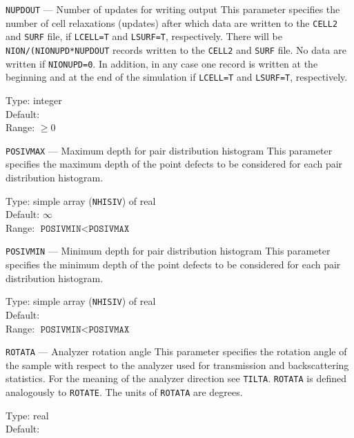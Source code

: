 \ifprivate
\begin{keydescription}{\texttt{NUPDOUT} --- Number of updates for writing output}
%
  This parameter specifies the number of cell relaxations (updates) after which data are 
  written to the \texttt{CELL2} and \texttt{SURF} file, if \texttt{LCELL=T} and 
  \texttt{LSURF=T}, respectively. There will be \texttt{NION/(NIONUPD*NUPDOUT} records written 
  to the \texttt{CELL2} and \texttt{SURF} file.  No data are written if \texttt{NIONUPD=0}. In 
  addition, in any case one record is written at the beginning and at the end of the 
  simulation if \texttt{LCELL=T} and \texttt{LSURF=T}, respectively. 
  \begin{keytab}
    Type:    \> integer \\
    Default:  \\
    Range:   \> $\ge 0$
  \end{keytab}
\end{keydescription}
\fi

\begin{keydescription}{\texttt{POSIVMAX} --- Maximum depth for pair distribution histogram}
%
  This parameter specifies the maximum depth of the point defects to be considered for each 
  pair distribution histogram.
  \begin{keytab}
    Type:    \> simple array (\texttt{NHISIV}) of real \\
    Default: \> $\infty$ \\
    Range:   \> $\texttt{POSIVMIN} < \texttt{POSIVMAX}$
  \end{keytab}
\end{keydescription}

\begin{keydescription}{\texttt{POSIVMIN} --- Minimum depth for pair distribution histogram}
%
  This parameter specifies the minimum depth of the point defects to be considered for each 
  pair distribution histogram.
  \begin{keytab}
    Type:    \> simple array (\texttt{NHISIV}) of real \\
    Default:  \\
    Range:   \> $\texttt{POSIVMIN} < \texttt{POSIVMAX}$
  \end{keytab}
\end{keydescription}

\begin{keydescription}{\texttt{ROTATA} --- Analyzer rotation angle}
%
  This parameter specifies the rotation angle of the sample with respect to the analyzer used 
  for transmission and backscattering statistics. For the meaning of the analyzer direction see
  \texttt{TILTA}. {\tt ROTATA} is defined analogously to \texttt{ROTATE}. The units of 
  \texttt{ROTATA} are degrees.
  \begin{keytab}
    Type:    \> real \\
    Default:  
  \end{keytab}
\end{keydescription}


